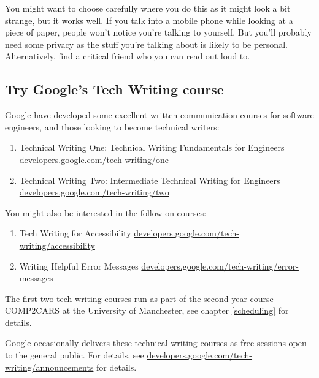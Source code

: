 \documentclass[
]{book}
\providecommand{\tightlist}{%
  \setlength{\itemsep}{0pt}\setlength{\parskip}{0pt}}
\begin{document}
You might want to choose carefully where you do this as it might look a bit strange, but it works well. If you talk into a mobile phone while looking at a piece of paper, people won't notice you're talking to yourself. But you'll probably need some privacy as the stuff you're talking about is likely to be personal. Alternatively, find a critical friend who you can read out loud to.

\hypertarget{techwriting}{%
\subsection{Try Google's Tech Writing course}\label{techwriting}}

Google have developed some excellent written communication courses for software engineers, and those looking to become technical writers:

\begin{enumerate}
\def\labelenumi{\arabic{enumi}.}
\tightlist
\item
  Technical Writing One: Technical Writing Fundamentals for Engineers \href{https://developers.google.com/tech-writing/one}{developers.google.com/tech-writing/one}
\item
  Technical Writing Two: Intermediate Technical Writing for Engineers \href{https://developers.google.com/tech-writing/two}{developers.google.com/tech-writing/two}
\end{enumerate}

You might also be interested in the follow on courses:

\begin{enumerate}
\def\labelenumi{\arabic{enumi}.}
\tightlist
\item
  Tech Writing for Accessibility \href{https://developers.google.com/tech-writing/accessibility}{developers.google.com/tech-writing/accessibility}
\item
  Writing Helpful Error Messages \href{https://developers.google.com/tech-writing/error-messages}{developers.google.com/tech-writing/error-messages}
\end{enumerate}

The first two tech writing courses run as part of the second year course COMP2CARS at the University of Manchester, see chapter \ref{scheduling} for details.

Google occasionally delivers these technical writing courses as free sessions open to the general public. For details, see \href{https://developers.google.com/tech-writing/announcements}{developers.google.com/tech-writing/announcements} for details.
\end{document}
